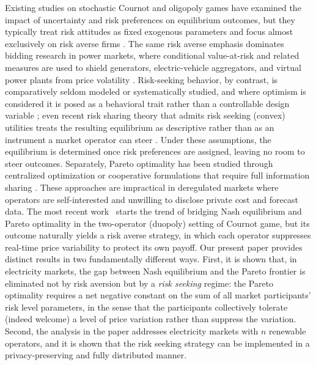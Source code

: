 \documentclass[journal]{IEEEtran}
\begin{document}
Existing studies on stochastic Cournot and oligopoly games have examined the impact of uncertainty and risk preferences on equilibrium outcomes,
but they typically treat risk attitudes as fixed exogenous parameters and focus almost exclusively on risk averse firms \cite{cheng2002bertrand,sakai1989risk, gulpinar2014analysis, asplund2002risk, Chronopoulos2014}.
The same risk averse emphasis dominates bidding research in power markets, where conditional value-at-risk and related measures are used to shield generators, electric-vehicle aggregators, and virtual power plants from price volatility \cite{Barroso2009, Gong2009, Zheng2023, Xiao2025}.
Risk-seeking behavior, by contrast, is comparatively seldom modeled or systematically studied, and where optimism is considered it is posed as a behavioral trait rather than a controllable design variable \cite{Caraballo2015, Feng2023, ZhangEcon2020}; even recent risk sharing theory that admits risk seeking (convex) utilities treats the resulting equilibrium as descriptive rather than as an instrument a market operator can steer \cite{Lauzier2024}.
Under these assumptions, the equilibrium is determined once risk preferences are assigned, leaving no room to steer outcomes. Separately, Pareto optimality has been studied through centralized optimization or cooperative formulations that require full information sharing \cite{hobbs2001individual, zhao2010social, su2018integrated}. These approaches are impractical in deregulated markets where operators are self-interested and unwilling to disclose private cost and forecast data. The most recent work~\cite{Truong26} starts the trend of bridging Nash equilibrium and Pareto optimality in the two-operator (duopoly) setting of Cournot game, but its outcome naturally yields a risk averse strategy, in which each operator suppresses real-time price variability to protect its own payoff. Our present paper provides distinct results in two fundamentally different ways. First, it is shown that, in electricity markets, the gap between Nash equilibrium and the Pareto frontier is eliminated not by risk aversion but by a \emph{risk seeking} regime: the Pareto optimality requires a net negative constant on the sum of all market participants' risk level parameters, in the sense that the participants collectively tolerate (indeed welcome) a level of price variation rather than suppress the variation. Second, the analysis in the paper addresses electricity markets with $n$ renewable operators, and it is shown that the risk seeking strategy can be implemented in a privacy-preserving and fully distributed manner.
\end{document}

